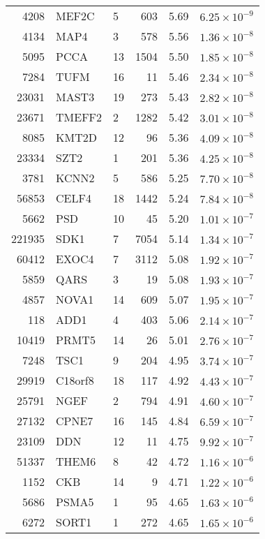\begin{table}[ht]
\begin{tabular}{rllrrr}
  4208 & MEF2C & 5 & 603 & 5.69 & $6.25 \times 10^{-9}$ \\ 
  4134 & MAP4 & 3 & 578 & 5.56 & $1.36 \times 10^{-8}$ \\ 
  5095 & PCCA & 13 & 1504 & 5.50 & $1.85 \times 10^{-8}$ \\ 
  7284 & TUFM & 16 &  11 & 5.46 & $2.34 \times 10^{-8}$ \\ 
  23031 & MAST3 & 19 & 273 & 5.43 & $2.82 \times 10^{-8}$ \\ 
  23671 & TMEFF2 & 2 & 1282 & 5.42 & $3.01 \times 10^{-8}$ \\ 
  8085 & KMT2D & 12 &  96 & 5.36 & $4.09 \times 10^{-8}$ \\ 
  23334 & SZT2 & 1 & 201 & 5.36 & $4.25 \times 10^{-8}$ \\ 
  3781 & KCNN2 & 5 & 586 & 5.25 & $7.70 \times 10^{-8}$ \\ 
  56853 & CELF4 & 18 & 1442 & 5.24 & $7.84 \times 10^{-8}$ \\ 
  5662 & PSD & 10 &  45 & 5.20 & $1.01 \times 10^{-7}$ \\ 
  221935 & SDK1 & 7 & 7054 & 5.14 & $1.34 \times 10^{-7}$ \\ 
  60412 & EXOC4 & 7 & 3112 & 5.08 & $1.92 \times 10^{-7}$ \\ 
  5859 & QARS & 3 &  19 & 5.08 & $1.93 \times 10^{-7}$ \\ 
  4857 & NOVA1 & 14 & 609 & 5.07 & $1.95 \times 10^{-7}$ \\ 
  118 & ADD1 & 4 & 403 & 5.06 & $2.14 \times 10^{-7}$ \\ 
  10419 & PRMT5 & 14 &  26 & 5.01 & $2.76 \times 10^{-7}$ \\ 
  7248 & TSC1 & 9 & 204 & 4.95 & $3.74 \times 10^{-7}$ \\ 
  29919 & C18orf8 & 18 & 117 & 4.92 & $4.43 \times 10^{-7}$ \\ 
  25791 & NGEF & 2 & 794 & 4.91 & $4.60 \times 10^{-7}$ \\ 
  27132 & CPNE7 & 16 & 145 & 4.84 & $6.59 \times 10^{-7}$ \\ 
  23109 & DDN & 12 &  11 & 4.75 & $9.92 \times 10^{-7}$ \\ 
  51337 & THEM6 & 8 &  42 & 4.72 & $1.16 \times 10^{-6}$ \\ 
  1152 & CKB & 14 &   9 & 4.71 & $1.22 \times 10^{-6}$ \\ 
  5686 & PSMA5 & 1 &  95 & 4.65 & $1.63 \times 10^{-6}$ \\ 
  6272 & SORT1 & 1 & 272 & 4.65 & $1.65 \times 10^{-6}$ \\ 

\end{tabular}
\end{table}
